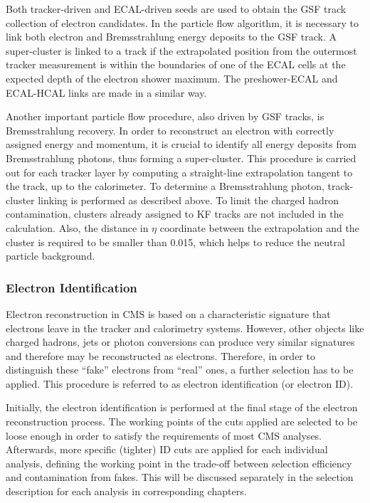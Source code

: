 Both tracker-driven and ECAL-driven seeds are used to obtain the GSF track collection of electron candidates. In the
particle flow algorithm, it is necessary to link both electron and Bremsstrahlung energy deposits to the GSF track. A
super-cluster is linked to a track if the extrapolated position from the outermost tracker measurement is within the
boundaries of one of the ECAL cells at the expected depth of the electron shower maximum. The preshower-ECAL and
ECAL-HCAL links are made in a similar way.

Another important particle flow procedure, also driven by GSF tracks, is Bremsstrahlung recovery. In order to
reconstruct an electron with correctly assigned energy and momentum, it is crucial to identify all energy deposits from
Bremsstrahlung photons, thus forming a super-cluster. This procedure is carried out for each tracker layer by computing
a straight-line extrapolation tangent to the track, up to the calorimeter. To determine a Bremsstrahlung photon,
track-cluster linking is performed as described above. To limit the charged hadron contamination, clusters already
assigned to KF tracks are not included in the calculation. Also, the distance in $\eta$ coordinate between the
extrapolation and the cluster is required to be smaller than \num{0.015}, which helps to reduce the neutral particle
background.

\subsubsection{Electron Identification}
\label{sss:electron_id}

Electron reconstruction in CMS is based on a characteristic signature that electrons leave in the tracker and
calorimetry systems. However, other objects like charged hadrons, jets or photon conversions can produce very similar
signatures and therefore may be reconstructed as electrons. Therefore, in order to distinguish these ``fake'' electrons
from ``real'' ones, a further selection has to be applied. This procedure is referred to as electron identification (or
electron ID).

Initially, the electron identification is performed at the final stage of the electron reconstruction process. The
working points of the cuts applied are selected to be loose enough in order to satisfy the requirements of most CMS
analyses. Afterwards, more specific (tighter) ID cuts are applied for each individual analysis, defining the working
point in the trade-off between selection efficiency and contamination from fakes. This will be discussed separately in
the selection description for each analysis in corresponding chapters.

